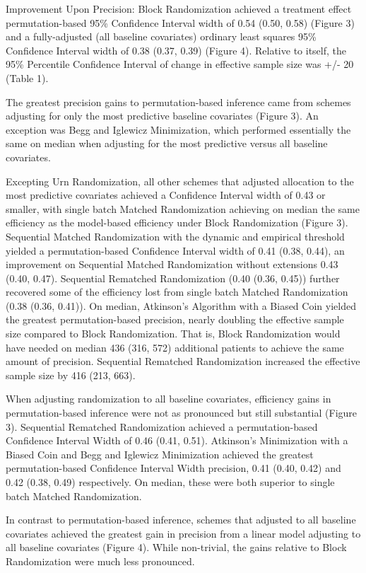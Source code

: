 \documentclass[12pt,oneside]{book}
\newlength{\li}\setlength{\li}{14.48pt}
\newlength{\di}\setlength{\di}{-3.5mm}
\theoremstyle{definition}
\theoremstyle{definition}
\theoremstyle{definition}
\theoremstyle{remark}
\begin{document}
Improvement Upon Precision: Block Randomization achieved a treatment
effect permutation-based 95\% Confidence Interval width of 0.54 (0.50,
0.58) (Figure 3) and a fully-adjusted (all baseline covariates) ordinary
least squares 95\% Confidence Interval width of 0.38 (0.37, 0.39)
(Figure 4). Relative to itself, the 95\% Percentile Confidence Interval
of change in effective sample size was +/- 20 (Table 1).

The greatest precision gains to permutation-based inference came from
schemes adjusting for only the most predictive baseline covariates
(Figure 3). An exception was Begg and Iglewicz Minimization, which
performed essentially the same on median when adjusting for the most
predictive versus all baseline covariates.

Excepting Urn Randomization, all other schemes that adjusted allocation
to the most predictive covariates achieved a Confidence Interval width
of 0.43 or smaller, with single batch Matched Randomization achieving on
median the same efficiency as the model-based efficiency under Block
Randomization (Figure 3). Sequential Matched Randomization with the
dynamic and empirical threshold yielded a permutation-based Confidence
Interval width of 0.41 (0.38, 0.44), an improvement on Sequential
Matched Randomization without extensions 0.43 (0.40, 0.47). Sequential
Rematched Randomization (0.40 (0.36, 0.45)) further recovered some of
the efficiency lost from single batch Matched Randomization (0.38 (0.36,
0.41)). On median, Atkinson's Algorithm with a Biased Coin yielded the
greatest permutation-based precision, nearly doubling the effective
sample size compared to Block Randomization. That is, Block
Randomization would have needed on median 436 (316, 572) additional
patients to achieve the same amount of precision. Sequential Rematched
Randomization increased the effective sample size by 416 (213, 663).

When adjusting randomization to all baseline covariates, efficiency
gains in permutation-based inference were not as pronounced but still
substantial (Figure 3). Sequential Rematched Randomization achieved a
permutation-based Confidence Interval Width of 0.46 (0.41, 0.51).
Atkinson's Minimization with a Biased Coin and Begg and Iglewicz
Minimization achieved the greatest permutation-based Confidence Interval
Width precision, 0.41 (0.40, 0.42) and 0.42 (0.38, 0.49) respectively.
On median, these were both superior to single batch Matched
Randomization.

In contrast to permutation-based inference, schemes that adjusted to all
baseline covariates achieved the greatest gain in precision from a
linear model adjusting to all baseline covariates (Figure 4). While
non-trivial, the gains relative to Block Randomization were much less
pronounced.
\end{document}
